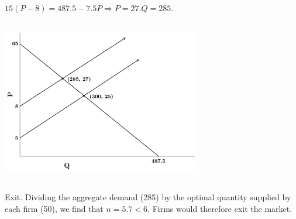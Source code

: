 \documentclass{article}
\begin{document}
	\subsection[e]{}
		$ 15(P-8) = 487.5 - 7.5P \Rightarrow P = 27. Q = 285.$
	\subsection[f]{}
		\includegraphics[height=2.5in]{Charts/7f}
	\subsection[g]{}
		Exit. Dividing the aggregate demand (285) by the optimal quantity supplied by each firm (50), we find that $n=5.7<6.$ Firms would therefore exit the market. 
														
				
\end{document}
